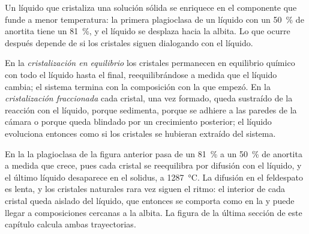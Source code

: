 \begin{omfigure}
\par{}
\end{omfigure}

Un líquido que cristaliza una solución sólida se enriquece en el componente que
funde a menor temperatura: la primera plagioclasa de un líquido con un
\qty{50}{\percent} de anortita tiene un \qty{81}{\percent}, y el líquido se desplaza hacia
la albita. Lo que ocurre después depende de si los cristales siguen dialogando con el
líquido.

\begin{definition}
\label{def:b2:magmatic-differentiation:crystallisation}
En la \emph{cristalización en equilibrio} los
cristales permanecen en equilibrio químico con todo el líquido hasta el
final, reequilibrándose a medida que el líquido cambia; el sistema termina con la composición
con la que empezó. En la \emph{cristalización fraccionada}
cada cristal, una vez formado, queda sustraído de la reacción con el
líquido, porque sedimenta, porque se adhiere a las paredes de la cámara o porque queda
blindado por un crecimiento posterior; el líquido evoluciona entonces como si los cristales se hubieran
extraído del sistema.
\end{definition}

En la  la plagioclasa de la figura anterior pasa de
un \qty{81}{\percent} a un \qty{50}{\percent} de anortita a medida que crece, pues cada cristal
se reequilibra por difusión con el líquido, y el último líquido desaparece en
el solidus, a \qty{1287}{\celsius}. La difusión en el feldespato es lenta, y los cristales
naturales rara vez siguen el ritmo: el interior de cada cristal queda aislado del líquido,
que entonces se comporta como en la  y puede llegar a composiciones
cercanas a la albita. La figura de la última sección de este capítulo calcula ambas trayectorias.

